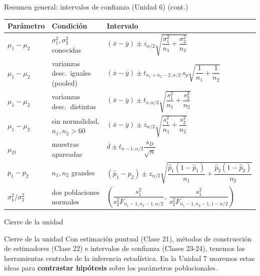 \documentclass[aspectratio=169,11pt]{beamer}
\begin{document}
\begin{frame}{Resumen general: intervalos de confianza (Unidad 6) (cont.)}
\begin{center}
\scriptsize
\begin{tabular}{lll}
\toprule
\textbf{Parámetro} & \textbf{Condición} & \textbf{Intervalo} \\
\midrule
$\mu_1-\mu_2$ & $\sigma_1^2,\sigma_2^2$ conocidas & $(\overline x-\overline y)\pm z_{\alpha/2}\sqrt{\dfrac{\sigma_1^2}{n_1}+\dfrac{\sigma_2^2}{n_2}}$ \\[1.5ex]
$\mu_1-\mu_2$ & varianzas desc.\ iguales (pooled) & $(\overline x-\overline y)\pm t_{n_1+n_2-2,\alpha/2}\,s_p\sqrt{\dfrac1{n_1}+\dfrac1{n_2}}$ \\[1.5ex]
$\mu_1-\mu_2$ & varianzas desc.\ distintas & $(\overline x-\overline y)\pm t_{\nu,\alpha/2}\sqrt{\dfrac{s_1^2}{n_1}+\dfrac{s_2^2}{n_2}}$ \\[1.5ex]
$\mu_1-\mu_2$ & sin normalidad, $n_1,n_2>60$ & $(\overline x-\overline y)\pm z_{\alpha/2}\sqrt{\dfrac{s_1^2}{n_1}+\dfrac{s_2^2}{n_2}}$ \\[1.5ex]
$\mu_D$ & muestras apareadas & $\overline d \pm t_{n-1,\alpha/2}\dfrac{s_D}{\sqrt n}$ \\[1ex]
$p_1-p_2$ & $n_1,n_2$ grandes & $(\widehat p_1-\widehat p_2)\pm z_{\alpha/2}\sqrt{\dfrac{\widehat p_1(1-\widehat p_1)}{n_1}+\dfrac{\widehat p_2(1-\widehat p_2)}{n_2}}$ \\[1.5ex]
$\sigma_1^2/\sigma_2^2$ & dos poblaciones normales & $\left(\dfrac{s_1^2}{s_2^2 F_{n_1-1,n_2-1,\alpha/2}},\ \dfrac{s_1^2}{s_2^2 F_{n_1-1,n_2-1,1-\alpha/2}}\right)$ \\
\bottomrule
\end{tabular}
\end{center}
\end{frame}

\begin{frame}{Cierre de la unidad}
\begin{alertblock}{Cierre de la unidad}
Con estimación puntual (Clase 21), métodos de construcción de estimadores (Clase 22) e intervalos de confianza (Clases 23-24), tenemos las herramientas centrales de la inferencia estadística. En la Unidad 7 usaremos estas ideas para \textbf{contrastar hipótesis} sobre los parámetros poblacionales.
\end{alertblock}
\end{frame}
\end{document}
